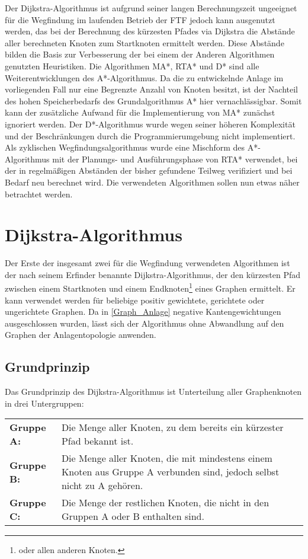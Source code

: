 		Der Dijkstra-Algorithmus ist aufgrund seiner langen Berechnungszeit ungeeignet für die Wegfindung im laufenden Betrieb der \ac{FTF} jedoch kann ausgenutzt werden, das bei der Berechnung des kürzesten Pfades via Dijkstra die Abstände aller berechneten Knoten zum Startknoten ermittelt werden. Diese Abstände bilden die Basis zur Verbesserung der bei einem der Anderen Algorithmen genutzten Heuristiken. Die Algorithmen \ac{MA*}, \ac{RTA*} und \ac{D*} sind alle Weiterentwicklungen des A*-Algorithmus.  Da die zu entwickelnde Anlage im vorliegenden Fall nur eine Begrenzte Anzahl von Knoten besitzt, ist der Nachteil des hohen Speicherbedarfs des Grundalgorithmus A* hier vernachlässigbar. Somit kann der zusätzliche Aufwand für die Implementierung von \ac{MA*} zunächst ignoriert werden. Der \ac{D*}-Algorithmus wurde wegen seiner höheren Komplexität und der Beschränkungen durch die Programmierumgebung nicht implementiert. Als zyklischen Wegfindungsalgorithmus wurde eine Mischform des A*-Algorithmus mit der Planungs- und Ausführungsphase von \ac{RTA*} verwendet, bei der in regelmäßigen Abständen der bisher gefundene Teilweg verifiziert und bei Bedarf neu berechnet wird. Die verwendeten Algorithmen sollen nun etwas näher betrachtet werden.
		
	
\section{Dijkstra-Algorithmus}
	Der Erste der insgesamt zwei für die Wegfindung verwendeten Algorithmen ist der nach seinem Erfinder benannte Dijkstra-Algorithmus, der den kürzesten Pfad zwischen einem Startknoten und einem Endknoten\footnote{oder allen anderen Knoten.} eines Graphen ermittelt. Er kann verwendet werden für beliebige positiv gewichtete, gerichtete oder ungerichtete Graphen. Da in \ref{Graph_Anlage} negative Kantengewichtungen ausgeschlossen wurden, lässt sich der Algorithmus ohne Abwandlung auf den Graphen der Anlagentopologie anwenden.
	\subsection{Grundprinzip}
		\label{Dijkstra_Alg}
		Das Grundprinzip des Dijkstra-Algorithmus ist Unterteilung aller Graphenknoten in drei Untergruppen\cite{DijkstraAlg}:
		
		\begin{tabular}{p{2.5cm} p{10cm}}	
			\textbf{Gruppe A:} & Die Menge aller Knoten, zu dem bereits ein kürzester Pfad bekannt ist.\\[0.25cm]
			\textbf{Gruppe B:} & Die Menge aller Knoten, die mit mindestens einem Knoten aus Gruppe A verbunden sind, jedoch selbst nicht zu A gehören.\\[0.25cm]
			\textbf{Gruppe C:} & Die Menge der restlichen Knoten, die nicht in den Gruppen A oder B enthalten sind.\\[0.25cm]
		\end{tabular}
		
